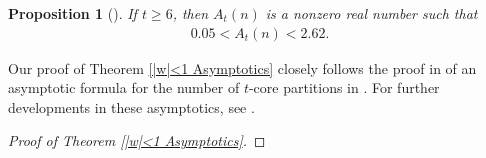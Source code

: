 \documentclass[pdftex]{sigma}
\numberwithin{equation}{section}
\newtheorem{Proposition}[Theorem]{Proposition}
\begin{document}
\begin{Proposition}[{\cite[Proposition 6]{Anderson}}] If $t \geq 6$, then $A_t(n)$ is a nonzero real number such that
\begin{align*}
0.05 < A_t(n) < 2.62.
\end{align*}
\end{Proposition}



Our proof of Theorem \ref{|w|<1 Asymptotics} closely follows the proof in \cite{Anderson} of an asymptotic formula for the number of $t$-core partitions in \cite{Anderson}. For further developments in these asymptotics, see \cite{LP, Tyler}.



\begin{proof}[Proof of Theorem \ref{|w|<1 Asymptotics}]


\end{proof}
\end{document}
